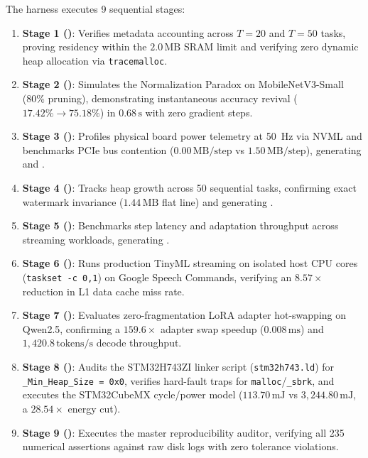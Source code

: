 \documentclass{article}
\begin{document}
The harness executes 9 sequential stages:
\begin{enumerate}\small\setlength{\itemsep}{1pt}\setlength{\parskip}{0pt}
    \item \textbf{Stage 1 ()}: Verifies metadata accounting across $T=20$ and $T=50$ tasks, proving residency within the $2.0\,\text{MB}$ SRAM limit and verifying zero dynamic heap allocation via \texttt{tracemalloc}.
    \item \textbf{Stage 2 ()}: Simulates the Normalization Paradox on MobileNetV3-Small (80\% pruning), demonstrating instantaneous accuracy revival ($17.42\% \to 75.18\%$) in $0.68\,\text{s}$ with zero gradient steps.
    \item \textbf{Stage 3 ()}: Profiles physical board power telemetry at 50~Hz via NVML and benchmarks PCIe bus contention ($0.00\,\text{MB/step}$ vs $1.50\,\text{MB/step}$), generating  and .
    \item \textbf{Stage 4 ()}: Tracks heap growth across 50 sequential tasks, confirming exact watermark invariance ($1.44\,\text{MB}$ flat line) and generating .
    \item \textbf{Stage 5 ()}: Benchmarks step latency and adaptation throughput across streaming workloads, generating .
    \item \textbf{Stage 6 ()}: Runs production TinyML streaming on isolated host CPU cores (\texttt{taskset -c 0,1}) on Google Speech Commands, verifying an $8.57\times$ reduction in L1 data cache miss rate.
    \item \textbf{Stage 7 ()}: Evaluates zero-fragmentation LoRA adapter hot-swapping on Qwen2.5, confirming a $159.6\times$ adapter swap speedup ($0.008\,\text{ms}$) and $1,420.8\,\text{tokens/s}$ decode throughput.
    \item \textbf{Stage 8 ()}: Audits the STM32H743ZI linker script (\texttt{stm32h743.ld}) for \texttt{\_Min\_Heap\_Size = 0x0}, verifies hard-fault traps for \texttt{malloc}/\texttt{\_sbrk}, and executes the STM32CubeMX cycle/power model ($113.70\,\text{mJ}$ vs $3,244.80\,\text{mJ}$, a $28.54\times$ energy cut).
    \item \textbf{Stage 9 ()}: Executes the master reproducibility auditor, verifying all 235 numerical assertions against raw disk logs with zero tolerance violations.
\end{enumerate}
\end{document}
